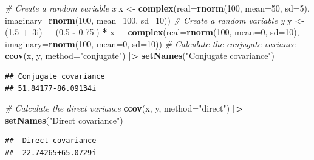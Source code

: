 \documentclass[
]{book}
\newenvironment{Shaded}{\begin{snugshade}}{\end{snugshade}}
\newcommand{\CommentTok}[1]{\textcolor[rgb]{0.56,0.35,0.01}{\textit{#1}}}
\newcommand{\DataTypeTok}[1]{\textcolor[rgb]{0.13,0.29,0.53}{#1}}
\newcommand{\DecValTok}[1]{\textcolor[rgb]{0.00,0.00,0.81}{#1}}
\newcommand{\ErrorTok}[1]{\textcolor[rgb]{0.64,0.00,0.00}{\textbf{#1}}}
\newcommand{\FloatTok}[1]{\textcolor[rgb]{0.00,0.00,0.81}{#1}}
\newcommand{\KeywordTok}[1]{\textcolor[rgb]{0.13,0.29,0.53}{\textbf{#1}}}
\newcommand{\NormalTok}[1]{#1}
\newcommand{\OperatorTok}[1]{\textcolor[rgb]{0.81,0.36,0.00}{\textbf{#1}}}
\newcommand{\StringTok}[1]{\textcolor[rgb]{0.31,0.60,0.02}{#1}}
\begin{document}
\begin{Shaded}
\begin{Highlighting}[]
\CommentTok{\# Create a random variable x}
\NormalTok{x \textless{}{-}}\StringTok{ }\KeywordTok{complex}\NormalTok{(}\DataTypeTok{real=}\KeywordTok{rnorm}\NormalTok{(}\DecValTok{100}\NormalTok{, }\DataTypeTok{mean=}\DecValTok{50}\NormalTok{, }\DataTypeTok{sd=}\DecValTok{5}\NormalTok{),}
             \DataTypeTok{imaginary=}\KeywordTok{rnorm}\NormalTok{(}\DecValTok{100}\NormalTok{, }\DataTypeTok{mean=}\DecValTok{100}\NormalTok{, }\DataTypeTok{sd=}\DecValTok{10}\NormalTok{))}
\CommentTok{\# Create a random variable y}
\NormalTok{y \textless{}{-}}\StringTok{ }\NormalTok{(}\FloatTok{1.5} \OperatorTok{+}\StringTok{ }\NormalTok{3i) }\OperatorTok{+}\StringTok{ }\NormalTok{(}\FloatTok{0.5} \OperatorTok{{-}}\StringTok{ }\FloatTok{0.75}\NormalTok{i) }\OperatorTok{*}\StringTok{ }\NormalTok{x }\OperatorTok{+}
\StringTok{            }\KeywordTok{complex}\NormalTok{(}\DataTypeTok{real=}\KeywordTok{rnorm}\NormalTok{(}\DecValTok{100}\NormalTok{, }\DataTypeTok{mean=}\DecValTok{0}\NormalTok{, }\DataTypeTok{sd=}\DecValTok{10}\NormalTok{),}
                    \DataTypeTok{imaginary=}\KeywordTok{rnorm}\NormalTok{(}\DecValTok{100}\NormalTok{, }\DataTypeTok{mean=}\DecValTok{0}\NormalTok{, }\DataTypeTok{sd=}\DecValTok{10}\NormalTok{))}
\CommentTok{\# Calculate the conjugate variance}
\KeywordTok{ccov}\NormalTok{(x, y, }\DataTypeTok{method=}\StringTok{"conjugate"}\NormalTok{) }\OperatorTok{|}\ErrorTok{\textgreater{}}
\StringTok{    }\KeywordTok{setNames}\NormalTok{(}\StringTok{"Conjugate covariance"}\NormalTok{)}
\end{Highlighting}
\end{Shaded}

\begin{verbatim}
## Conjugate covariance 
## 51.84177-86.09134i
\end{verbatim}

\begin{Shaded}
\begin{Highlighting}[]
\CommentTok{\# Calculate the direct variance}
\KeywordTok{ccov}\NormalTok{(x, y, }\DataTypeTok{method=}\StringTok{"direct"}\NormalTok{) }\OperatorTok{|}\ErrorTok{\textgreater{}}
\StringTok{    }\KeywordTok{setNames}\NormalTok{(}\StringTok{"Direct covariance"}\NormalTok{)}
\end{Highlighting}
\end{Shaded}

\begin{verbatim}
##  Direct covariance 
## -22.74265+65.0729i
\end{verbatim}
\end{document}
